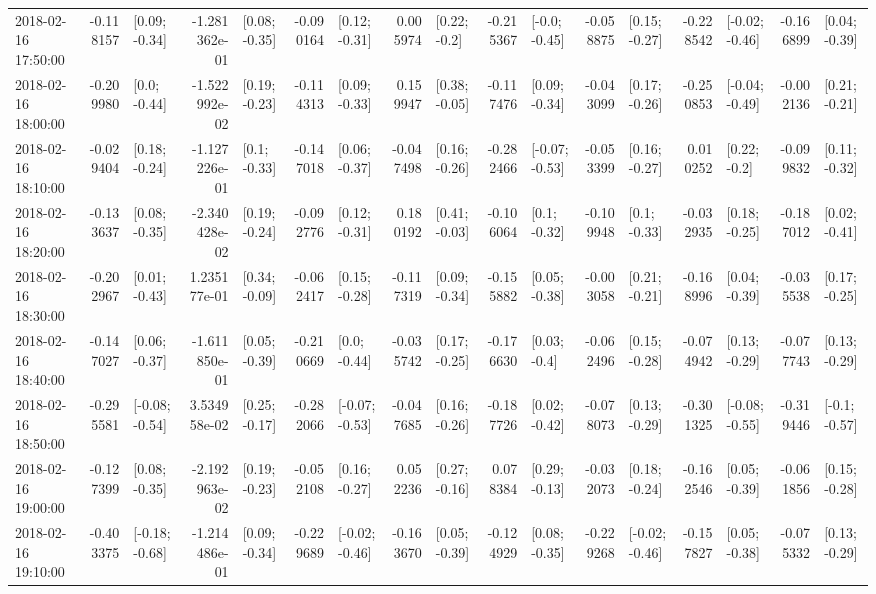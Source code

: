 \begin{tabular}{lrlrlrlrlrlrlrlrl}
2018-02-16 17:50:00 & -0.118157 &   [0.09; -0.34] & -1.281362e-01 &   [0.08; -0.35] & -0.090164 &   [0.12; -0.31] &  0.005974 &    [0.22; -0.2] & -0.215367 &   [-0.0; -0.45] & -0.058875 &   [0.15; -0.27] & -0.228542 &  [-0.02; -0.46] & -0.166899 &   [0.04; -0.39] \\
2018-02-16 18:00:00 & -0.209980 &    [0.0; -0.44] & -1.522992e-02 &   [0.19; -0.23] & -0.114313 &   [0.09; -0.33] &  0.159947 &   [0.38; -0.05] & -0.117476 &   [0.09; -0.34] & -0.043099 &   [0.17; -0.26] & -0.250853 &  [-0.04; -0.49] & -0.002136 &   [0.21; -0.21] \\
2018-02-16 18:10:00 & -0.029404 &   [0.18; -0.24] & -1.127226e-01 &    [0.1; -0.33] & -0.147018 &   [0.06; -0.37] & -0.047498 &   [0.16; -0.26] & -0.282466 &  [-0.07; -0.53] & -0.053399 &   [0.16; -0.27] &  0.010252 &    [0.22; -0.2] & -0.099832 &   [0.11; -0.32] \\
2018-02-16 18:20:00 & -0.133637 &   [0.08; -0.35] & -2.340428e-02 &   [0.19; -0.24] & -0.092776 &   [0.12; -0.31] &  0.180192 &   [0.41; -0.03] & -0.106064 &    [0.1; -0.32] & -0.109948 &    [0.1; -0.33] & -0.032935 &   [0.18; -0.25] & -0.187012 &   [0.02; -0.41] \\
2018-02-16 18:30:00 & -0.202967 &   [0.01; -0.43] &  1.235177e-01 &   [0.34; -0.09] & -0.062417 &   [0.15; -0.28] & -0.117319 &   [0.09; -0.34] & -0.155882 &   [0.05; -0.38] & -0.003058 &   [0.21; -0.21] & -0.168996 &   [0.04; -0.39] & -0.035538 &   [0.17; -0.25] \\
2018-02-16 18:40:00 & -0.147027 &   [0.06; -0.37] & -1.611850e-01 &   [0.05; -0.39] & -0.210669 &    [0.0; -0.44] & -0.035742 &   [0.17; -0.25] & -0.176630 &    [0.03; -0.4] & -0.062496 &   [0.15; -0.28] & -0.074942 &   [0.13; -0.29] & -0.077743 &   [0.13; -0.29] \\
2018-02-16 18:50:00 & -0.295581 &  [-0.08; -0.54] &  3.534958e-02 &   [0.25; -0.17] & -0.282066 &  [-0.07; -0.53] & -0.047685 &   [0.16; -0.26] & -0.187726 &   [0.02; -0.42] & -0.078073 &   [0.13; -0.29] & -0.301325 &  [-0.08; -0.55] & -0.319446 &   [-0.1; -0.57] \\
2018-02-16 19:00:00 & -0.127399 &   [0.08; -0.35] & -2.192963e-02 &   [0.19; -0.23] & -0.052108 &   [0.16; -0.27] &  0.052236 &   [0.27; -0.16] &  0.078384 &   [0.29; -0.13] & -0.032073 &   [0.18; -0.24] & -0.162546 &   [0.05; -0.39] & -0.061856 &   [0.15; -0.28] \\
2018-02-16 19:10:00 & -0.403375 &  [-0.18; -0.68] & -1.214486e-01 &   [0.09; -0.34] & -0.229689 &  [-0.02; -0.46] & -0.163670 &   [0.05; -0.39] & -0.124929 &   [0.08; -0.35] & -0.229268 &  [-0.02; -0.46] & -0.157827 &   [0.05; -0.38] & -0.075332 &   [0.13; -0.29] \\

\end{tabular}
